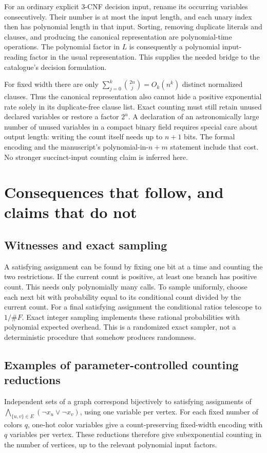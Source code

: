 \documentclass[11pt,a4paper]{article}
\numberwithin{equation}{section}
\theoremstyle{definition}
\theoremstyle{remark}
\begin{document}
For an ordinary explicit 3-CNF decision input, rename its occurring variables
consecutively. Their number is at most the input length, and each unary index
then has polynomial length in that input. Sorting, removing duplicate literals
and clauses, and producing the canonical representation are polynomial-time
operations. The polynomial factor in $L$ is consequently a polynomial
input-reading factor in the usual representation. This supplies the needed
bridge to the catalogue's decision formulation.

For fixed width there are only
$\sum_{j=0}^k\binom{2n}{j}=O_k(n^k)$ distinct normalized clauses. Thus the
canonical representation also cannot hide a positive exponential rate solely
in its duplicate-free clause list. Exact counting must still retain unused
declared variables or restore a factor $2^u$. A declaration of an astronomically
large number of unused variables in a compact binary field requires special
care about output length: writing the count itself needs up to $n+1$ bits.
The formal encoding and the manuscript's polynomial-in-$n+m$ statement include
that cost. No stronger succinct-input counting claim is inferred here.

\section{Consequences that follow, and claims that do not}
\label{sec:consequences}
\subsection{Witnesses and exact sampling}
A satisfying assignment can be found by fixing one bit at a time and counting
the two restrictions. If the current count is positive, at least one branch
has positive count. This needs only polynomially many calls.
To sample uniformly, choose each next bit with probability equal to its
conditional count divided by the current count. For a final satisfying
assignment the conditional ratios telescope to $1/\#F$. Exact integer
sampling implements these rational probabilities with polynomial expected
overhead. This is a randomized exact sampler, not a deterministic procedure
that somehow produces randomness.

\subsection{Examples of parameter-controlled counting reductions}
Independent sets of a graph correspond bijectively to satisfying assignments
of $\bigwedge_{\{u,v\}\in E}(\neg x_u\vee\neg x_v)$, using one variable per
vertex. For each fixed number of colors $q$, one-hot color variables give a
count-preserving fixed-width encoding with $q$ variables per vertex. These
reductions therefore give subexponential counting in the number of vertices,
up to the relevant polynomial input factors.
\end{document}
